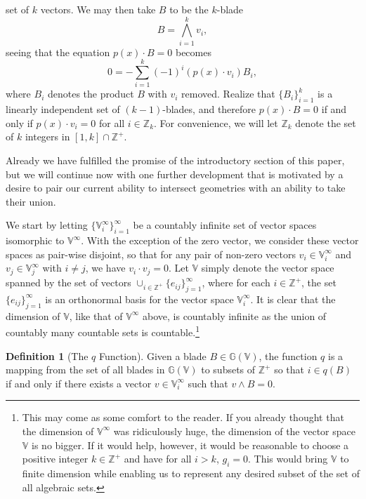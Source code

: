 \documentclass{birkjour}
\theoremstyle{definition}
\newtheorem{defn}[thm]{Definition}
\theoremstyle{remark}
\numberwithin{equation}{section}
\newcommand{\G}{\mathbb{G}}
\newcommand{\V}{\mathbb{V}}
\newcommand{\Z}{\mathbb{Z}}
\begin{document}
set of $k$ vectors.
We may then take $B$ to be the $k$-blade
\begin{equation}
B=\bigwedge_{i=1}^k v_i,
\end{equation}
seeing that the equation $p(x)\cdot B=0$ becomes
\begin{equation}\label{equ_intersection_of_geometries}
0 = -\sum_{i=1}^k (-1)^i(p(x)\cdot v_i)B_i,
\end{equation}
where $B_i$ denotes the product $B$ with $v_i$ removed.  Realize
that $\{B_i\}_{i=1}^k$ is a linearly independent set of $(k-1)$-blades,
and therefore $p(x)\cdot B=0$ if and only if $p(x)\cdot v_i=0$ for all $i\in\Z_k$.
For convenience, we will let $\Z_k$ denote the set of $k$ integers in $[1,k]\cap\Z^+$.

Already we have fulfilled the promise of the introductory section of this paper,
but we will continue now with one further development that is motivated by a desire
to pair our current ability to intersect geometries with an ability to take their union.

We start by letting $\{\V_i^\infty\}_{i=1}^\infty$ be a countably infinite set of
vector spaces isomorphic to $\V^\infty$.  With the exception of the zero vector,
we consider these vector spaces as pair-wise disjoint, so that for any pair of non-zero
vectors $v_i\in\V_i^\infty$ and $v_j\in\V_j^\infty$ with $i\neq j$, we have $v_i\cdot v_j=0$.
Let $\V$ simply denote the vector space spanned by the set of vectors $\cup_{i\in\Z^+}\{e_{ij}\}_{j=1}^\infty$,
where for each $i\in\Z^+$, the set $\{e_{ij}\}_{j=1}^\infty$ is an orthonormal basis for
the vector space $\V_i^\infty$.
It is clear that the dimension of $\V$,
like that of $\V^\infty$ above, is countably infinite as the union of countably many countable
sets is countable.\footnote{This may come as some comfort to the reader. If you already thought that
the dimension of $\V^\infty$ was ridiculously huge, the dimension of the vector space $\V$ is no bigger.
If it would help, however, it would be reasonable to choose a positive integer $k\in\Z^+$ and
have for all $i>k$, $g_i=0$.  This would bring $\V$ to finite dimension while
enabling us to represent any desired subset of the set of all algebraic sets.}

\begin{defn}[The $q$ Function]\label{def_q_func}
Given a blade $B\in\G(\V)$, the function $q$ is a mapping from
the set of all blades in $\G(\V)$ to subsets of $\Z^+$ so that $i\in q(B)$ if and only if
there exists a vector $v\in\V_i^\infty$ such that $v\wedge B=0$.
\end{defn}
\end{document}
